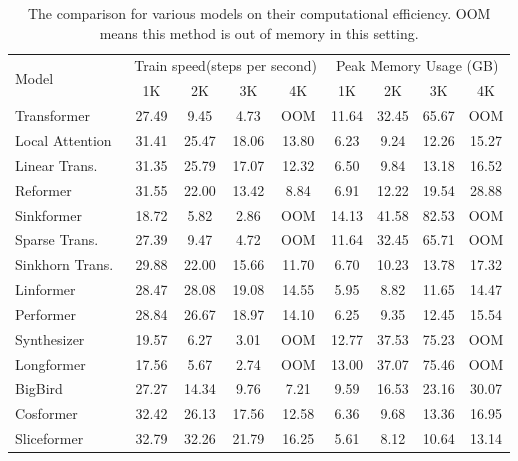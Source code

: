 \begin{table}[htbp]
  \centering
  \caption{The comparison for various models on their computational efficiency. OOM means this method is out of memory in this setting.}
    \begin{tabular}{l|cccc|cccc}
    \toprule
    \multirow{2}{*}{Model}  & \multicolumn{4}{c|}{Train speed(steps per second)}  & \multicolumn{4}{c}{Peak Memory Usage (GB)} \\
     & 1K    & 2K    & 3K    & 4K    &  1K    & 2K    & 3K    & 4K \\
    \midrule
    Transformer~\cite{vaswani2017attention} & 27.49 & 9.45  & 4.73  & OOM & 11.64 & 32.45 & 65.67 &  OOM \\
    \midrule
    Local Attention~\cite{tay2021long} & 31.41 & 25.47 & 18.06 & 13.80 &  6.23  & 9.24  & 12.26 & 15.27 \\
    Linear Trans.~\cite{katharopoulos2020transformers} & 31.35 & 25.79 & 17.07 & 12.32 & 6.50  & 9.84  & 13.18 & 16.52 \\
    Reformer~\cite{kitaev2020reformer} & 31.55 & 22.00 & 13.42 & 8.84  &  6.91  & 12.22 & 19.54 & 28.88 \\
    Sinkformer~\cite{sander2022sinkformers} & 18.72 & 5.82  & 2.86  & OOM  & 14.13 & 41.58 & 82.53 & OOM \\
    Sparse Trans.~\cite{child2019generating} & 27.39 & 9.47  & 4.72  & OOM & 11.64 & 32.45 & 65.71 & OOM \\
    Sinkhorn Trans.~\cite{tay2020sparse} & 29.88 & 22.00 & 15.66 & 11.70 &  6.70  & 10.23 & 13.78 & 17.32 \\
    Linformer~\cite{wang2020linformer} & 28.47 & 28.08 & 19.08 & 14.55 &  5.95  & 8.82  & 11.65 & 14.47 \\
    Performer~\cite{choromanski2021rethinking} & 28.84 & 26.67 & 18.97 & 14.10 & 6.25  & 9.35  & 12.45 & 15.54 \\
    Synthesizer~\cite{tay2021synthesizer} & 19.57 & 6.27  & 3.01  & OOM &  12.77 & 37.53 & 75.23 & OOM  \\
    Longformer~\cite{beltagy2020longformer} & 17.56 & 5.67  & 2.74  &  OOM & 13.00 & 37.07 & 75.46 & OOM\\
    BigBird~\cite{zaheer2020big} & 27.27 & 14.34 & 9.76  & 7.21  & 9.59  & 16.53 & 23.16 & 30.07 \\    
    Cosformer~\cite{zhen2022cosformer} & 32.42 & 26.13 & 17.56 & 12.58 & 6.36 & 9.68 & 13.36 & 16.95 \\
    \midrule
    Sliceformer & 32.79 & 32.26 & 21.79 & 16.25  & 5.61  & 8.12  & 10.64 & 13.14 \\
    \bottomrule
    \end{tabular}%
  \label{tab:addlabel}%
\end{table}%


